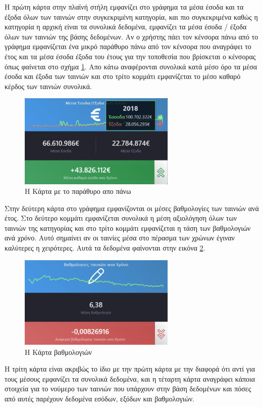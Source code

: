 Η πρώτη κάρτα στην πλαϊνή στήλη εμφανίζει στο γράφημα τα μέσα έσοδα και τα έξοδα όλων των ταινιών στην συγκεκριμένη κατηγορία, και πιο συγκεκριμένα καθώς η κατηγορία η αρχική είναι τα συνολικά δεδομένα, εμφανίζει τα μέσα έσοδα / έξοδα όλων των ταινιών της βάσης δεδομένων. Αν ο χρήστης πάει τον κένσορα πάνω από το γράφημα εμφανίζεται ένα μικρό παράθυρο πάνω από τον κένσορα που αναγράφει το έτος και τα μέσα έσοδα έξοδα του έτους για την τοποθεσία που βρίσκεται ο κένσορας όπως φαίνεται στο σχήμα \ref{demo:sidebar_card:hover}. Απο κάτω αναφέρονται συνολικά κατά μέσο όρο τα μέσα έσοδα και έξοδα των ταινιών και στο τρίτο κομμάτι εμφανίζεται το μέσο καθαρό κέρδος των ταινιών συνολικά.

\begin{figure}[H]
  \centering
  \includegraphics[width=75mm]{Chapters/6 - Manual/Images/main_page_sidebar_card_hover.png}
  \caption{Η Κάρτα με το παράθυρο απο πάνω}
  \label{demo:sidebar_card:hover}
\end{figure}

Στην δεύτερη κάρτα στο γράφημα εμφανίζονται οι μέσες βαθμολογίες των ταινιών ανά έτος. Στο δεύτερο κομμάτι εμφανίζεται συνολικά η μέση αξιολόγηση όλων των ταινιών της κατηγορίας και στο τρίτο κομμάτι εμφανίζεται η τάση των βαθμολογιών ανά χρόνο. Αυτό σημαίνει αν οι ταινίες μέσα στο πέρασμα των χρώνων έγιναν καλύτερες η χειρότερες. Αυτά τα δεδομένα φαίνονται στην εικόνα \ref{demo:sidebar_card:vote}.

\begin{figure}[H]
  \centering
  \includegraphics[width=75mm]{Chapters/6 - Manual/Images/main_page_sidebar_vote_card.png}
  \caption{Η Κάρτα βαθμολογιών}
  \label{demo:sidebar_card:vote}
\end{figure}

Η τρίτη κάρτα είναι ακριβώς το ίδιο με την πρώτη κάρτα με την διαφορά ότι αντί για τους μέσους εμφανίζει τα συνολικά δεδομένα, και η τέταρτη κάρτα αναγράφει κάποια στοιχεία για το νούμερο των ταινιών που υπάρχουν στην βάση δεδομένων και πόσες από αυτές παρέχουν δεδομένα εσόδων, εξόδων και βαθμολογιών.